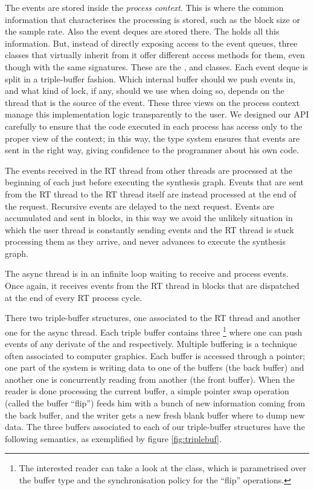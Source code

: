 The events are stored inside the  \emph{process
  context}. This is where the common information that characterises
the processing is stored, such as the block size or the sample
rate. Also the event deques are stored there. The
 holds all this information. But,
instead of directly exposing access to the event queues, three classes
that virtually inherit from it offer different access methods for
them, even though with the same signatures. These are the
,  and
 classes. Each event deque is split in a
triple-buffer fashion. Which internal buffer should we push events in,
and what kind of lock, if any, should we use when doing so, depends on
the thread that is the source of the event. These three views on the
process context manage this implementation logic transparently to the
user. We designed our API carefully to ensure that the code executed
in each process has access only to the proper view of the context; in
this way, the type system ensures that events are sent in the right
way, giving confidence to the programmer about his own code.

The events received in the RT thread from other threads are processed
at the beginning of each  just before
executing the synthesis graph. Events that are sent from the RT thread
to the RT thread itself are instead processed at the end of the
request. Recursive events are delayed to the next request. Events are
accumulated and sent in blocks, in this way we avoid the unlikely
situation in which the user thread is constantly sending events and
the RT thread is stuck processing them as they arrive, and never
advances to execute the synthesis graph.

\label{fig:triplebuf}
The async thread is in an infinite loop waiting to receive and process
events. Once again, it receives events from the RT thread in blocks
that are dispatched at the end of every RT process cycle.

There two triple-buffer structures, one
associated to the RT thread and another one for the async thread. Each
triple buffer contains three \footnote{The
  interested reader can take a look at the
   class, which is parametrised over the
  buffer type and the synchronisation policy for the ``flip''
  operations.} where one can push events of any derivate of the
 and  respectively. Multiple
buffering is a technique often associated to computer graphics. Each
buffer is accessed through a pointer; one part of the system is
 writing data to one of the buffers (the back
buffer) and another one is concurrently reading from another (the
front buffer).  When the reader is done processing
the current buffer, a simple pointer swap operation (called the buffer
``flip'') feeds him with a bunch of new information coming from the
back buffer, and the writer gets a new fresh blank buffer where to
dump new data. The three buffers associated to each of our
triple-buffer structures have the following semantics, as exemplified
by figure \ref{fig:triplebuf}. 

